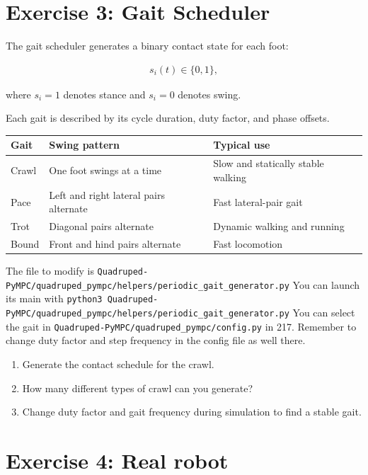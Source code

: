 \documentclass[11pt,a4paper]{article}
\begin{document}
\section*{Exercise 3: Gait Scheduler}

The gait scheduler generates a binary contact state for each foot:

\begin{align*}
	s_i(t) \in \{0,1\},
\end{align*}

where \(s_i=1\) denotes stance and \(s_i=0\) denotes swing.

Each gait is described by its cycle duration, duty factor, and phase offsets.

\begin{table}[h]
	\centering
	\begin{tabular}{lll}
		\toprule
		Gait & Swing pattern & Typical use \\
		\midrule
		Crawl & One foot swings at a time & Slow and statically stable walking \\
		Pace & Left and right lateral pairs alternate & Fast lateral-pair gait \\
		Trot & Diagonal pairs alternate & Dynamic walking and running \\
		Bound & Front and hind pairs alternate & Fast locomotion \\
		\bottomrule
	\end{tabular}
\end{table}


The file to modify is \verb|Quadruped-PyMPC/quadruped_pympc/helpers/periodic_gait_generator.py|
You can launch its main with \verb|python3 Quadruped-PyMPC/quadruped_pympc/helpers/periodic_gait_generator.py|
You can select the gait in \verb|Quadruped-PyMPC/quadruped_pympc/config.py| in 217. Remember to change duty factor and step frequency in the config file as well there.
\begin{enumerate}[label=\arabic*.]
	\item Generate the contact schedule for the crawl.
	\item How many different types of crawl can you generate?
	\item Change duty factor and gait frequency during simulation to find a stable gait.
\end{enumerate}



\section*{Exercise 4: Real robot}
\end{document}
